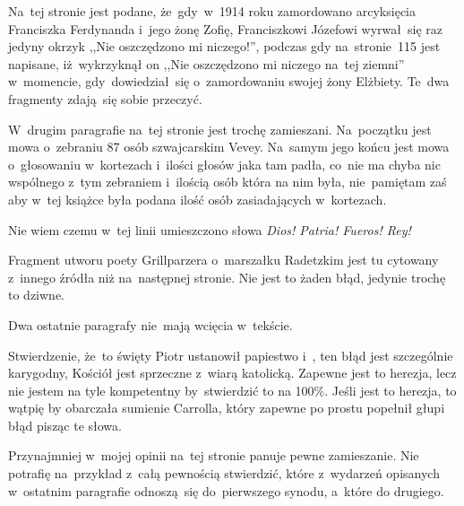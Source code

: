 \documentclass[a4paper,11pt]{article}
\begin{document}
\vspace{\spaceFour}


\start {} Na~tej stronie jest podane, że~gdy~w~1914 roku
zamordowano arcyksięcia Franciszka Ferdynanda i~jego żonę Zofię,
Franciszkowi Józefowi wyrwał~się raz jedyny okrzyk ,,Nie oszczędzono
mi niczego!'', podczas gdy na~stronie~115 jest napisane, iż~wykrzyknął
on ,,Nie oszczędzono mi niczego na~tej ziemni'' w~momencie,
gdy~dowiedział~się o~zamordowaniu swojej żony Elżbiety. Te~dwa
fragmenty zdają~się sobie przeczyć.

\vspace{\spaceFour}


\start {} W~drugim paragrafie na~tej stronie jest trochę
zamieszani. Na~początku jest mowa o~zebraniu 87 osób szwajcarskim
Vevey. Na~samym jego końcu jest mowa o~głosowaniu w~kortezach i~ilości
głosów jaka tam padła, co~nie ma chyba nic wspólnego z~tym zebraniem
i~ilością osób która na nim była, nie~pamiętam zaś aby w~tej książce
była podana ilość osób zasiadających w~kortezach.

\vspace{\spaceFour}


\start {} Nie wiem czemu w~tej linii umieszczono słowa
\emph{Dios! Patria! Fueros! Rey!}

\vspace{\spaceFour}


\start {} Fragment utworu poety Grillparzera o~marszałku
Radetzkim jest tu cytowany z~innego źródła niż na~następnej stronie.
Nie jest to żaden błąd, jedynie trochę to dziwne.

\vspace{\spaceFour}


\start {} Dwa ostatnie paragrafy nie~mają wcięcia w~tekście.

\vspace{\spaceFour}


\start {} Stwierdzenie, że~to święty Piotr ustanowił papiestwo
i~, ten błąd jest szczególnie karygodny, Kościół jest sprzeczne
z~wiarą katolicką. Zapewne jest to herezja, lecz nie jestem na tyle
kompetentny by~stwierdzić to na 100\%. Jeśli jest to herezja, to
wątpię by obarczała sumienie Carrolla, który zapewne po prostu
popełnił głupi błąd pisząc te słowa.

\vspace{\spaceFour}


\start {} Przynajmniej w~mojej opinii na~tej stronie panuje
pewne zamieszanie. Nie potrafię na~przykład z~całą pewnością
stwierdzić, które z~wydarzeń opisanych w~ostatnim paragrafie
odnoszą~się do~pierwszego synodu, a~które do drugiego.
\end{document}
